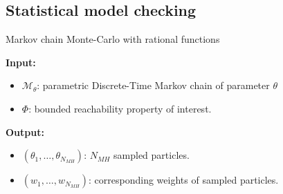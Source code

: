 \subsection{Statistical model checking}

\begin{algorithm}[H]
    \caption{Markov chain Monte-Carlo with rational functions}
    \label{rf-mcmc-alg}
    \hspace*{\algorithmicindent} \textbf{Input:}
    \begin{itemize}
        \item $\mathcal{M}_\theta$: parametric Discrete-Time Markov chain of parameter $\theta$
        \item $\Phi$: bounded reachability property of interest.
    \end{itemize}
    \hspace*{\algorithmicindent} \textbf{Output:}
    \begin{itemize}
        \item $(\theta_1,\ldots,\theta_{N_{MH}})$: $N_{MH}$ sampled particles.
        \item $(w_1,\ldots,w_{N_{MH}})$: corresponding weights of sampled particles.
    \end{itemize}
    \begin{algorithmic}[1]
        \EndProcedure
    \end{algorithmic}
\end{algorithm}
